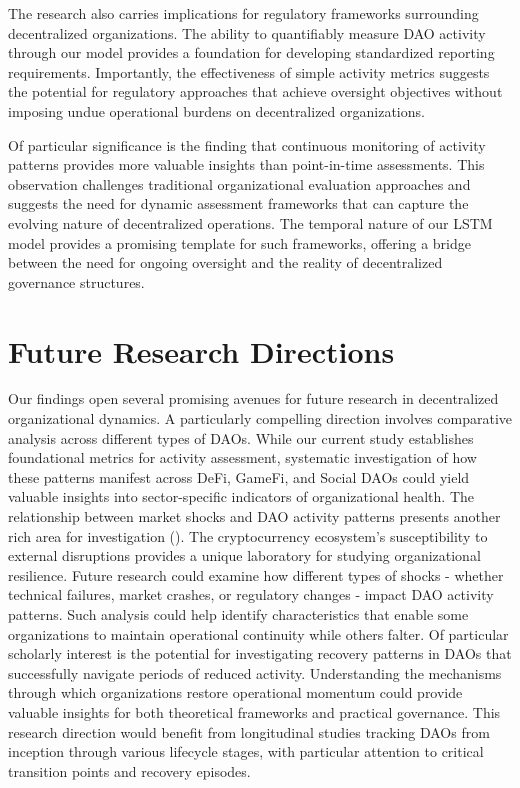 The research also carries implications for regulatory frameworks surrounding decentralized organizations. The ability to quantifiably measure DAO activity through our model provides a foundation for developing standardized reporting requirements. Importantly, the effectiveness of simple activity metrics suggests the potential for regulatory approaches that achieve oversight objectives without imposing undue operational burdens on decentralized organizations.

Of particular significance is the finding that continuous monitoring of activity patterns provides more valuable insights than point-in-time assessments. This observation challenges traditional organizational evaluation approaches and suggests the need for dynamic assessment frameworks that can capture the evolving nature of decentralized operations. The temporal nature of our LSTM model provides a promising template for such frameworks, offering a bridge between the need for ongoing oversight and the reality of decentralized governance structures.










\section{Future Research Directions}

Our findings open several promising avenues for future research in decentralized organizational dynamics. A particularly compelling direction involves comparative analysis across different types of DAOs. While our current study establishes foundational metrics for activity assessment, systematic investigation of how these patterns manifest across DeFi, GameFi, and Social DAOs could yield valuable insights into sector-specific indicators of organizational health.
The relationship between market shocks and DAO activity patterns presents another rich area for investigation (\cite{faqir2021effect}). The cryptocurrency ecosystem's susceptibility to external disruptions provides a unique laboratory for studying organizational resilience. Future research could examine how different types of shocks - whether technical failures, market crashes, or regulatory changes - impact DAO activity patterns. Such analysis could help identify characteristics that enable some organizations to maintain operational continuity while others falter.
Of particular scholarly interest is the potential for investigating recovery patterns in DAOs that successfully navigate periods of reduced activity. Understanding the mechanisms through which organizations restore operational momentum could provide valuable insights for both theoretical frameworks and practical governance. This research direction would benefit from longitudinal studies tracking DAOs from inception through various lifecycle stages, with particular attention to critical transition points and recovery episodes.

